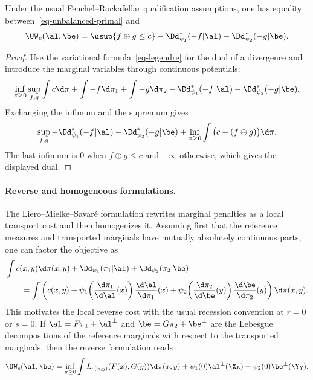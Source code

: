 \begin{prop}\label{prop-dual-unbalanced-ot}
	Under the usual Fenchel--Rockafellar qualification assumptions, one has equality between~\eqref{eq-unbalanced-primal} and
	\[
		\UW_c(\al,\be)
		=
		\usup{f\oplus g\leq c}
		-
		\Dd_{\psi_1}^*(-f|\al)
		-
		\Dd_{\psi_2}^*(-g|\be).
	\]
\end{prop}

\begin{proof}
	Use the variational formula~\eqref{eq-legendre} for the dual of a divergence and introduce the marginal variables through continuous potentials:
	\[
	\inf_{\pi\geq0}\sup_{f,g}
	\int c\d\pi + \int -f\d\pi_1 + \int -g\d\pi_2
	-
	\Dd_{\psi_1}^*(-f|\al)
	-
	\Dd_{\psi_2}^*(-g|\be).
	\]
	Exchanging the infimum and the supremum gives
	\[
	\sup_{f,g}
	-
	\Dd_{\psi_1}^*(-f|\al)
	-
	\Dd_{\psi_2}^*(-g|\be)
	+
	\inf_{\pi\geq0}\int\big(c-(f\oplus g)\big)\d\pi.
	\]
	The last infimum is $0$ when $f\oplus g\leq c$ and $-\infty$ otherwise, which gives the displayed dual.
\end{proof}

\paragraph{Reverse and homogeneous formulations.}

The Liero--Mielke--Savar\'e formulation rewrites marginal penalties as a local transport cost and then homogenizes it. Assuming first that the reference measures and transported marginals have mutually absolutely continuous parts, one can factor the objective as
\begin{align*}
&\int c(x,y)\d\pi(x,y)
+\Dd_{\psi_1}(\pi_1|\al)+\Dd_{\psi_2}(\pi_2|\be) \\
&\qquad =
\int
\left(
	c(x,y)
	+
	\psi_1\!\left(\frac{\d\pi_1}{\d\al}(x)\right)\frac{\d\al}{\d\pi_1}(x)
	+
	\psi_2\!\left(\frac{\d\pi_2}{\d\be}(y)\right)\frac{\d\be}{\d\pi_2}(y)
\right)
\d\pi(x,y).
\end{align*}
This motivates the local reverse cost
with the usual recession convention at $r=0$ or $s=0$. If $\al=F\pi_1+\al^\perp$ and $\be=G\pi_2+\be^\perp$ are the Lebesgue decompositions of the reference marginals with respect to the transported marginals, then the reverse formulation reads
\[
	\UW_c(\al,\be)
	=
	\inf_{\pi\geq0}
	\int L_{c(x,y)}(F(x),G(y))\d\pi(x,y)
	+
	\psi_1(0)\al^\perp(\Xx)
	+
	\psi_2(0)\be^\perp(\Yy).
\]

